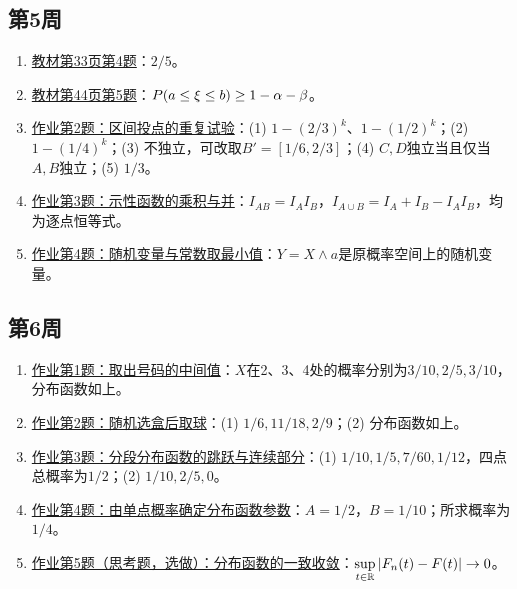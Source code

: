 \subsection*{第5周}
\begin{enumerate}
\item \hyperref[ex:w05-t33-4]{教材第33页第4题}：$2/5$。
\item \hyperref[ex:w05-t44-5]{教材第44页第5题}：$\P(a\leq\xi\leq b)\geq1-\alpha-\beta$。
\item \hyperref[ex:w05-h2]{作业第2题：区间投点的重复试验}：(1) $1-(2/3)^k$、$1-(1/2)^k$；(2) $1-(1/4)^k$；(3) 不独立，可改取$B'=[1/6,2/3]$；(4) $C,D$独立当且仅当$A,B$独立；(5) $1/3$。
\item \hyperref[ex:w05-h3]{作业第3题：示性函数的乘积与并}：$I_{AB}=I_AI_B$，$I_{A\cup B}=I_A+I_B-I_AI_B$，均为逐点恒等式。
\item \hyperref[ex:w05-h4]{作业第4题：随机变量与常数取最小值}：$Y=X\wedge a$是原概率空间上的随机变量。
\end{enumerate}
\subsection*{第6周}
\begin{enumerate}
\item \hyperref[ex:w06-h1]{作业第1题：取出号码的中间值}：$X$在2、3、4处的概率分别为$3/10,2/5,3/10$，分布函数如上。
\item \hyperref[ex:w06-h2]{作业第2题：随机选盒后取球}：(1) $1/6,11/18,2/9$；(2) 分布函数如上。
\item \hyperref[ex:w06-h3]{作业第3题：分段分布函数的跳跃与连续部分}：(1) $1/10,1/5,7/60,1/12$，四点总概率为$1/2$；(2) $1/10,2/5,0$。
\item \hyperref[ex:w06-h4]{作业第4题：由单点概率确定分布函数参数}：$A=1/2$，$B=1/10$；所求概率为$1/4$。
\item \hyperref[ex:w06-h5]{作业第5题（思考题，选做）：分布函数的一致收敛}：$\displaystyle\sup_{t\in\R}|F_n(t)-F(t)|\to0$。
\end{enumerate}
